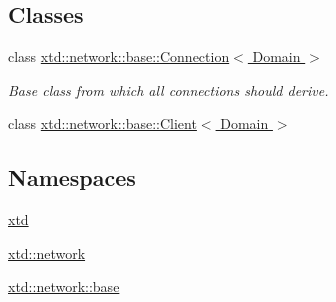 \subsection*{Classes}
\begin{DoxyCompactItemize}
\item 
class \hyperlink{classxtd_1_1network_1_1base_1_1Connection}{xtd\+::network\+::base\+::\+Connection$<$ Domain $>$}
\begin{DoxyCompactList}\small\item\em Base class from which all connections should derive. \end{DoxyCompactList}\item 
class \hyperlink{classxtd_1_1network_1_1base_1_1Client}{xtd\+::network\+::base\+::\+Client$<$ Domain $>$}
\end{DoxyCompactItemize}
\subsection*{Namespaces}
\begin{DoxyCompactItemize}
\item 
 \hyperlink{namespacextd}{xtd}
\item 
 \hyperlink{namespacextd_1_1network}{xtd\+::network}
\item 
 \hyperlink{namespacextd_1_1network_1_1base}{xtd\+::network\+::base}
\end{DoxyCompactItemize}
